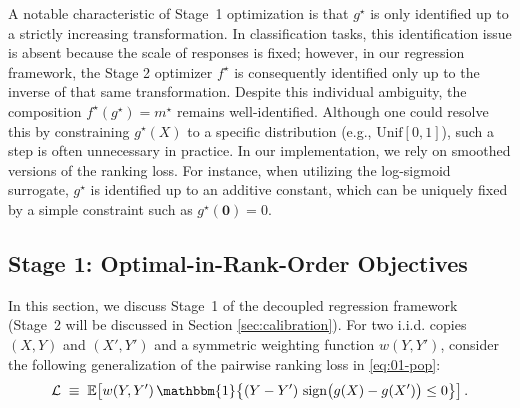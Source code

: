\documentclass[11pt]{article}
\theoremstyle{plain}
\theoremstyle{plain}
\theoremstyle{plain}
\theoremstyle{plain}
\theoremstyle{plain}
\theoremstyle{plain}
\theoremstyle{plain}
\begin{document}
A notable characteristic of Stage~1 optimization is that $g^{\star}$ is only identified up to a strictly increasing transformation. In classification tasks, this identification issue is absent because the scale of responses is fixed; however, in our regression framework, the Stage 2 optimizer $f^{\star}$ is consequently identified only up to the inverse of that same transformation. Despite this individual ambiguity, the composition $f^{\star}(g^{\star}) = m^{\star}$ remains well-identified.  Although one could resolve this by constraining $g^{\star}(X)$ to a specific distribution (e.g., $\text{Unif}[0,1]$), such a step is often unnecessary in practice. In our implementation, we rely on smoothed versions of the ranking loss.  For instance, when utilizing the log-sigmoid surrogate, $g^{\star}$ is identified up to an additive constant, which can be uniquely fixed by a simple constraint such as $g^{\star}(\mathbf{0})=0$.

\subsection{Stage 1: Optimal-in-Rank-Order Objectives}
\label{sec: ranking_phase}






In this section, we discuss Stage~1 of the decoupled regression framework (Stage~2 will be discussed in Section \ref{sec:calibration}). 
For two i.i.d. copies
$(X,Y)$ and $(X',Y')$ and a symmetric weighting function
$w(Y,Y')$, consider the following generalization of the pairwise ranking loss in \eqref{eq:01-pop}:
\begin{equation}
\label{weighted-01-pop}
\mathcal{L}
\;\equiv\;
\mathbb{E}\!\left[
  w(Y,Y')\,
  \mathbbm{1}\!\left\{
    (Y-Y')\,\operatorname{sign}\!\big(g(X)-g(X')\big) \le 0
  \right\}
\right].
\end{equation}
\end{document}
